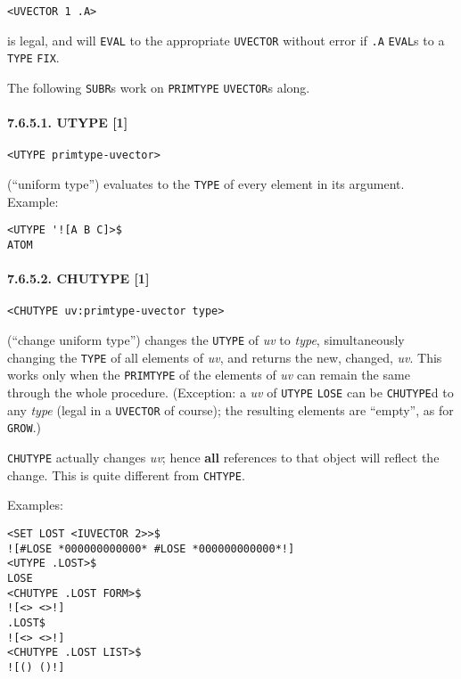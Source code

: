 \documentclass[a4paper,]{article}
\let\oldparagraph\paragraph
\renewcommand{\paragraph}[1]{\oldparagraph{#1}\mbox{}}
\begin{document}
\begin{verbatim}
<UVECTOR 1 .A>
\end{verbatim}

is legal, and will \texttt{EVAL} to the appropriate \texttt{UVECTOR} without error if \texttt{.A} \texttt{EVAL}s to a
\texttt{TYPE} \texttt{FIX}.

The following \texttt{SUBR}s work on \texttt{PRIMTYPE} \texttt{UVECTOR}s along.

\paragraph{7.6.5.1. UTYPE {[}1{]}}\label{utype-1}

\begin{verbatim}
<UTYPE primtype-uvector>
\end{verbatim}

 (``uniform type'') evaluates to the \texttt{TYPE} of every element in its argument. Example:

\begin{verbatim}
<UTYPE '![A B C]>$
ATOM
\end{verbatim}

\paragraph{7.6.5.2. CHUTYPE {[}1{]}}\label{chutype-1}

\begin{verbatim}
<CHUTYPE uv:primtype-uvector type>
\end{verbatim}

 (``change uniform type'') changes the \texttt{UTYPE} of \emph{uv} to \emph{type},
simultaneously changing the \texttt{TYPE} of all elements of \emph{uv}, and returns the new, changed, \emph{uv}. This works
only when the \texttt{PRIMTYPE} of the elements of \emph{uv} can remain the same through the whole procedure. (Exception: a
\emph{uv} of \texttt{UTYPE} \texttt{LOSE} can be \texttt{CHUTYPE}d to any \emph{type} (legal in a
\texttt{UVECTOR} of course); the resulting elements are ``empty'', as for \texttt{GROW}.)

\texttt{CHUTYPE} actually changes \emph{uv}; hence \textbf{all} references to that object will reflect the change. This is
quite different from \texttt{CHTYPE}.

Examples:

\begin{verbatim}
<SET LOST <IUVECTOR 2>>$
![#LOSE *000000000000* #LOSE *000000000000*!]
<UTYPE .LOST>$
LOSE
<CHUTYPE .LOST FORM>$
![<> <>!]
.LOST$
![<> <>!]
<CHUTYPE .LOST LIST>$
![() ()!]
\end{verbatim}
\end{document}
